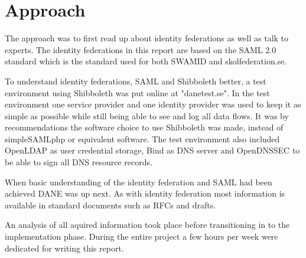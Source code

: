 \section{Approach}
The approach was to first read up about identity federations as well as talk to experts. 
The identity federations in this report are based on the SAML 2.0 standard which is the standard used for both SWAMID and skolfederation.se.
 
To understand identity federations, SAML and Shibboleth better, a test environment using Shibboleth was put online at "danetest.se". 
In the test environment one service provider and one identity provider was used to keep it as simple as possible while still being able to see and log all data flows.
It was by recommendations the software choice to use Shibboleth was made, instead of simpleSAMLphp or equivalent software.
The test environment also included OpenLDAP as user credential storage, Bind as DNS server and OpenDNSSEC to be able to sign all DNS resource records.

When basic understanding of the identity federation and SAML had been achieved DANE was up next.
As with identity federation most information is available in standard documents such as RFCs and drafts.

An analysis of all aquired information took place before transitioning in to the implementation phase.
During the entire project a few hours per week were dedicated for writing this report.





